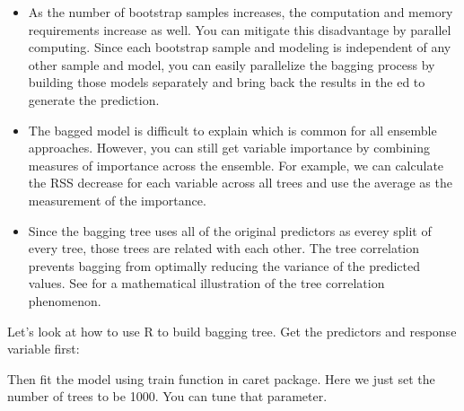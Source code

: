 \documentclass[12pt,]{krantz}
\makeatletter
\newenvironment{Shaded}{\begin{snugshade}}{\end{snugshade}}
\newcommand{\CommentTok}[1]{\textcolor[rgb]{0.37,0.37,0.37}{\textit{#1}}}
\newcommand{\KeywordTok}[1]{\textcolor[rgb]{0.27,0.27,0.27}{\textbf{#1}}}
\newcommand{\NormalTok}[1]{#1}
\newcommand{\OperatorTok}[1]{\textcolor[rgb]{0.43,0.43,0.43}{\textbf{#1}}}
\newcommand{\StringTok}[1]{\textcolor[rgb]{0.5,0.5,0.5}{#1}}
\newenvironment{kframe}{%
\medskip{}
\setlength{\fboxsep}{.8em}
 \def\at@end@of@kframe{}%
 \ifinner\ifhmode%
  \def\at@end@of@kframe{\end{minipage}}%
  \begin{minipage}{\columnwidth}%
 \fi\fi%
 \def\FrameCommand##1{\hskip\@totalleftmargin \hskip-\fboxsep
 \colorbox{shadecolor}{##1}\hskip-\fboxsep
     \hskip-\linewidth \hskip-\@totalleftmargin \hskip\columnwidth}%
 \MakeFramed {\advance\hsize-\width
   \@totalleftmargin\z@ \linewidth\hsize
   \@setminipage}}%
 {\par\unskip\endMakeFramed%
 \at@end@of@kframe}
\renewenvironment{Shaded}{\begin{kframe}}{\end{kframe}}
\makeatother
\begin{document}
\begin{itemize}
\item
  As the number of bootstrap samples increases, the computation and memory requirements increase as well. You can mitigate this disadvantage by parallel computing. Since each bootstrap sample and modeling is independent of any other sample and model, you can easily parallelize the bagging process by building those models separately and bring back the results in the ed to generate the prediction.
\item
  The bagged model is difficult to explain which is common for all ensemble approaches. However, you can still get variable importance by combining measures of importance across the ensemble. For example, we can calculate the RSS decrease for each variable across all trees and use the average as the measurement of the importance.
\item
  Since the bagging tree uses all of the original predictors as everey split of every tree, those trees are related with each other. The tree correlation prevents bagging from optimally reducing the variance of the predicted values. See \citep{Hastie2008} for a mathematical illustration of the tree correlation phenomenon.
\end{itemize}

Let's look at how to use R to build bagging tree. Get the predictors and response variable first:

\begin{Shaded}
\end{Shaded}

Then fit the model using train function in caret package. Here we just set the number of trees to be 1000. You can tune that parameter.
\end{document}
